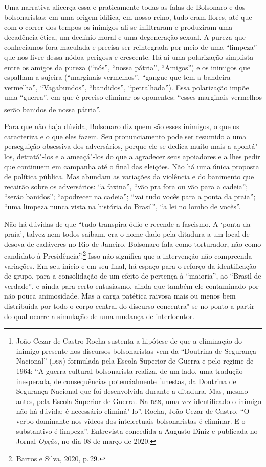 Uma narrativa alicerça essa e praticamente todas as falas de Bolsonaro e
dos bolsonaristas: em uma origem idílica, em nosso reino, tudo eram
flores, até que com o correr dos tempos os inimigos ali se infiltraram e
produziram uma decadência ética, um declínio moral e uma degeneração
sexual. A pureza que conhecíamos fora maculada e precisa ser reintegrada
por meio de uma ``limpeza'' que nos livre dessa nódoa perigosa e
crescente. Há aí uma polarização simplista entre os amigos da pureza
(``nós'', ``nossa pátria'', ``Amigos'') e os inimigos que espalham a
sujeira (``marginais vermelhos'', ``gangue que tem a bandeira
vermelha'', ``Vagabundos'', ``bandidos'', ``petralhada''). Essa
polarização impõe uma ``guerra'', em que é preciso eliminar os
oponentes: ``esses marginais vermelhos serão banidos de nossa
pátria''.\footnote{João Cezar de Castro Rocha sustenta a hipótese de que
  a eliminação do inimigo presente nos discursos bolsonaristas vem da
  ``Doutrina de Segurança Nacional'' (\textsc{dsn}) formulada pela Escola
  Superior de Guerra e pelo regime de 1964: ``A guerra cultural
  bolsonarista realiza, de um lado, uma tradução inesperada, de
  consequências potencialmente funestas, da Doutrina de Segurança
  Nacional que foi desenvolvida durante a ditadura. Mas, mesmo antes,
  pela Escola Superior de Guerra. Na \textsc{dsn}, uma vez identificado o inimigo
  não há dúvida: é necessário eliminá"-lo''. Rocha, João Cezar de
  Castro. ``O verbo dominante nos vídeos dos intelectuais bolsonaristas
  é eliminar. E o substantivo é limpeza''. Entrevista concedida a
  Augusto Diniz e publicada no Jornal \emph{Opção}, no dia 08 de março
  de 2020.}

Para que não haja dúvida, Bolsonaro diz quem são esses inimigos, o que
os caracteriza e o que eles fazem. Seu pronunciamento pode ser resumido
a uma perseguição obsessiva dos adversários, porque ele se dedica muito
mais a apontá"-los, detratá"-los e a ameaçá"-los do que a agradecer seus
apoiadores e a lhes pedir que continuem em campanha até o final das
eleições. Não há uma única proposta de política pública. Mas abundam as
variações da violência e do banimento que recairão sobre os adversários:
``a faxina'', ``vão pra fora ou vão para a cadeia''; ``serão banidos'';
``apodrecer na cadeia''; ``vai tudo vocês para a ponta da praia''; ``uma
limpeza nunca vista na história do Brasil'', ``a lei no lombo de
vocês''.

Não há dúvidas de que ``tudo transpira ódio e recende a fascismo. A
`ponta da praia', talvez nem todos saibam, era o nome dado pela ditadura
a um local de desova de cadáveres no Rio de Janeiro. Bolsonaro fala como
torturador, não como candidato à Presidência''.\footnote{Barros e Silva,
  2020, p.\,29.} Isso não significa que a intervenção não compreenda
variações. Em seu início e em seu final, há espaço para o reforço da
identificação de grupo, para a consolidação de um efeito de pertença à
``maioria'', ao ``Brasil de verdade'', e ainda para certo entusiasmo,
ainda que também ele contaminado por não pouca animosidade. Mas a carga
patética raivosa mais ou menos bem distribuída por todo o corpo central
do discurso concentra"-se no ponto a partir do qual ocorre a simulação de
uma mudança de interlocutor.

